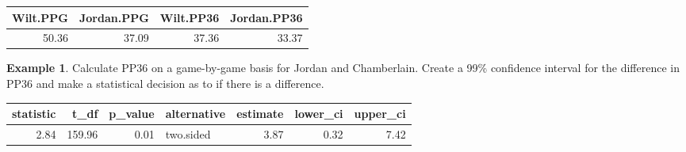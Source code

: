 \documentclass[
  11pt,
]{book}
\newenvironment{Shaded}{\begin{snugshade}}{\end{snugshade}}
\newcommand{\AttributeTok}[1]{\textcolor[rgb]{0.77,0.63,0.00}{#1}}
\newcommand{\DecValTok}[1]{\textcolor[rgb]{0.00,0.00,0.81}{#1}}
\newcommand{\FloatTok}[1]{\textcolor[rgb]{0.00,0.00,0.81}{#1}}
\newcommand{\FunctionTok}[1]{\textcolor[rgb]{0.00,0.00,0.00}{#1}}
\newcommand{\NormalTok}[1]{#1}
\newcommand{\OtherTok}[1]{\textcolor[rgb]{0.56,0.35,0.01}{#1}}
\newcommand{\SpecialCharTok}[1]{\textcolor[rgb]{0.00,0.00,0.00}{#1}}
\newcommand{\StringTok}[1]{\textcolor[rgb]{0.31,0.60,0.02}{#1}}
\theoremstyle{definition}
\theoremstyle{definition}
\newtheorem{example}{Example}[chapter]
\theoremstyle{definition}
\theoremstyle{definition}
\theoremstyle{remark}
\begin{document}
\begin{tabular}{rrrr}
\toprule
Wilt.PPG & Jordan.PPG & Wilt.PP36 & Jordan.PP36\\
\midrule
50.36 & 37.09 & 37.36 & 33.37\\
\bottomrule
\end{tabular}

\newpage

\begin{example}
Calculate PP36 on a game-by-game basis for Jordan and Chamberlain. Create a 99\% confidence interval for the difference in PP36 and make a statistical decision as to if there is a difference.
\end{example}

\begin{Shaded}
\end{Shaded}

\begin{tabular}{rrrlrrr}
\toprule
statistic & t\_df & p\_value & alternative & estimate & lower\_ci & upper\_ci\\
\midrule
2.84 & 159.96 & 0.01 & two.sided & 3.87 & 0.32 & 7.42\\
\bottomrule
\end{tabular}
\end{document}
